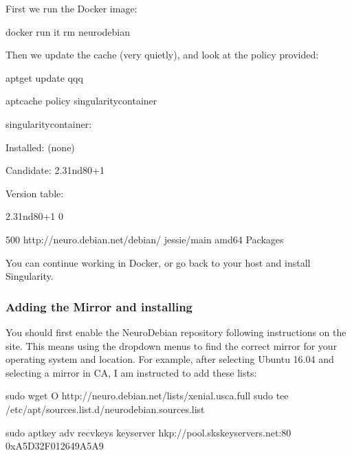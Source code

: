 \documentclass[letterpaper,10pt,english]{sphinxmanual}
\begin{document}
First we run the  Docker image:

%
\begin{sphinxVerbatim}[commandchars=\\\{\}]
\PYGZdl{} docker run \PYGZhy{}it \PYGZhy{}\PYGZhy{}rm neurodebian
\end{sphinxVerbatim}

Then we update the cache (very quietly), and look at the  policy provided:

%
\begin{sphinxVerbatim}[commandchars=\\\{\}]
\PYGZdl{} apt\PYGZhy{}get update \PYGZhy{}qqq

\PYGZdl{} apt\PYGZhy{}cache policy singularity\PYGZhy{}container

singularity\PYGZhy{}container:

  Installed: (none)

  Candidate: 2.3\PYGZhy{}1\PYGZti{}nd80+1

  Version table:

    2.3\PYGZhy{}1\PYGZti{}nd80+1 0

      500 http://neuro.debian.net/debian/ jessie/main amd64 Packages
\end{sphinxVerbatim}

You can continue working in Docker, or go back to your host and install Singularity.


\subsubsection{Adding the Mirror and installing}
\label{\detokenize{installation:adding-the-mirror-and-installing}}
You should first enable the NeuroDebian repository following instructions on the  site. This means using the dropdown menus to find the correct mirror for your operating system and location. For example, after selecting Ubuntu 16.04 and selecting a mirror in CA, I am instructed to add these lists:

%
\begin{sphinxVerbatim}[commandchars=\\\{\}]
sudo wget \PYGZhy{}O\PYGZhy{} http://neuro.debian.net/lists/xenial.us\PYGZhy{}ca.full \textbar{} sudo tee /etc/apt/sources.list.d/neurodebian.sources.list

sudo apt\PYGZhy{}key adv \PYGZhy{}\PYGZhy{}recv\PYGZhy{}keys \PYGZhy{}\PYGZhy{}keyserver hkp://pool.sks\PYGZhy{}keyservers.net:80 0xA5D32F012649A5A9
\end{sphinxVerbatim}
\end{document}
